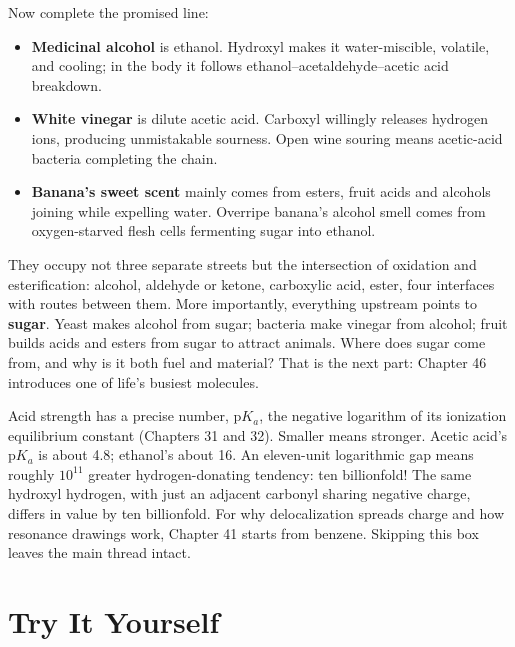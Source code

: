 Now complete the promised line:

\begin{itemize}[itemsep=2pt]
\item \textbf{Medicinal alcohol} is ethanol. Hydroxyl makes it water-miscible, volatile, and cooling; in the body it follows ethanol--acetaldehyde--acetic acid breakdown.
\item \textbf{White vinegar} is dilute acetic acid. Carboxyl willingly releases hydrogen ions, producing unmistakable sourness. Open wine souring means acetic-acid bacteria completing the chain.
\item \textbf{Banana's sweet scent} mainly comes from esters, fruit acids and alcohols joining while expelling water. Overripe banana's alcohol smell comes from oxygen-starved flesh cells fermenting sugar into ethanol.
\end{itemize}

They occupy not three separate streets but the intersection of oxidation and esterification: alcohol, aldehyde or ketone, carboxylic acid, ester, four interfaces with routes between them. More importantly, everything upstream points to \textbf{sugar}. Yeast makes alcohol from sugar; bacteria make vinegar from alcohol; fruit builds acids and esters from sugar to attract animals. Where does sugar come from, and why is it both fuel and material? That is the next part: Chapter 46 introduces one of life's busiest molecules.

\begin{tiaozhan}
Acid strength has a precise number, $\mathrm{p}K_a$, the negative logarithm of its ionization equilibrium constant (Chapters 31 and 32). Smaller means stronger. Acetic acid's $\mathrm{p}K_a$ is about 4.8; ethanol's about 16. An eleven-unit logarithmic gap means roughly $10^{11}$ greater hydrogen-donating tendency: ten billionfold! The same hydroxyl hydrogen, with just an adjacent carbonyl sharing negative charge, differs in value by ten billionfold. For why delocalization spreads charge and how resonance drawings work, Chapter 41 starts from benzene. Skipping this box leaves the main thread intact.
\end{tiaozhan}

\section*{Try It Yourself}

